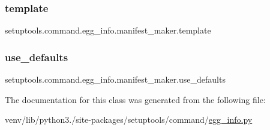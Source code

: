 \subsubsection{\texorpdfstring{template}{template}}
{\footnotesize\ttfamily setuptools.\+command.\+egg\+\_\+info.\+manifest\+\_\+maker.\+template\hspace{0.3cm}{\ttfamily [static]}}

\mbox{\label{classsetuptools_1_1command_1_1egg__info_1_1manifest__maker_a03b10f5d9682f7561f5dcb2e38f481c1}} 
\subsubsection{\texorpdfstring{use\+\_\+defaults}{use\_defaults}}
{\footnotesize\ttfamily setuptools.\+command.\+egg\+\_\+info.\+manifest\+\_\+maker.\+use\+\_\+defaults}



The documentation for this class was generated from the following file\+:\begin{DoxyCompactItemize}
\item 
venv/lib/python3./site-\/packages/setuptools/command/\hyperlink{setuptools_2command_2egg__info_8py}{egg\+\_\+info.\+py}\end{DoxyCompactItemize}

